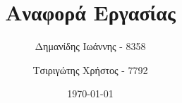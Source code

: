 

\subject{Συστήματα Πολυμέσων και Εικονική Πραγματικότητα}
\title{Αναφορά Εργασίας}
\author{%
	Δημανίδης Ιωάννης - 8358
  \and Τσιριγώτης Χρήστος - 7792
}
\date{\vspace{10cm}\today}


	\pagestyle{empty}

	\maketitle

	\clearpage


	\clearpage
	\pagestyle{scrheadings}
	\setcounter{page}{1}

	
	
	
	
	



